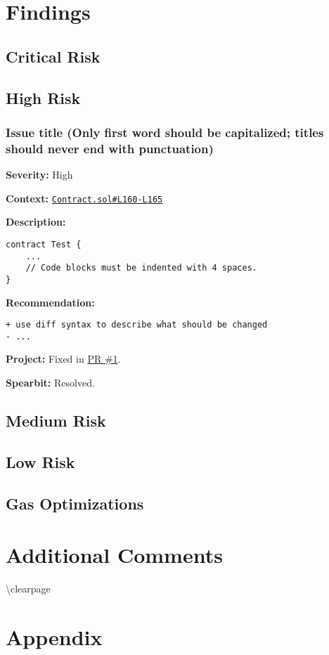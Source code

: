 \section{Findings}\label{findings}

\subsection{Critical Risk}\label{critical-risk}

\subsection{High Risk}\label{high-risk}

\subsubsection{Issue title (Only first word should be capitalized;
titles should never end with
punctuation)}\label{issue-title-only-first-word-should-be-capitalized-titles-should-never-end-with-punctuation}

\textbf{Severity:} High

\textbf{Context:}
\href{https://github.com/actuallink}{\texttt{Contract.sol\#L160-L165}}

\textbf{Description:}

\begin{verbatim}
contract Test {
    ...
    // Code blocks must be indented with 4 spaces.
}
\end{verbatim}

\textbf{Recommendation:}

\begin{verbatim}
+ use diff syntax to describe what should be changed
- ...
\end{verbatim}

\textbf{Project:} Fixed in \href{Https://github.com/actuallink}{PR \#1}.

\textbf{Spearbit:} Resolved.

\subsection{Medium Risk}\label{medium-risk}

\subsection{Low Risk}\label{low-risk}

\subsection{Gas Optimizations}\label{gas-optimizations}

\section{Additional Comments}\label{additional-comments}

\textbackslash clearpage

\section{Appendix}\label{appendix}
